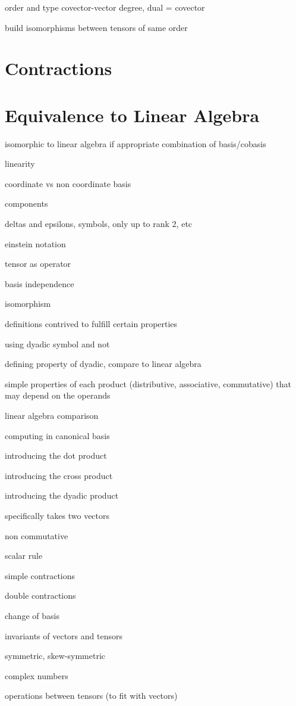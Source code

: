 order and type covector-vector degree, dual = covector

build isomorphisms between tensors of same order

\section{Contractions}

\section{Equivalence to Linear Algebra}

isomorphic to linear algebra if appropriate combination of basis/cobasis

linearity

coordinate vs non coordinate basis

components

deltas and epsilons, symbols, only up to rank 2, etc

einstein notation

tensor as operator

basis independence

isomorphism

definitions contrived to fulfill certain properties

using dyadic symbol and not

defining property of dyadic, compare to linear algebra

simple properties of each product (distributive, associative, commutative) that may depend on the operands

linear algebra comparison

computing in canonical basis

introducing the dot product

introducing the cross product

introducing the dyadic product

specifically takes two vectors

non commutative

scalar rule

simple contractions

double contractions

change of basis

invariants of vectors and tensors

symmetric, skew-symmetric

complex numbers

operations between tensors (to fit with vectors)

